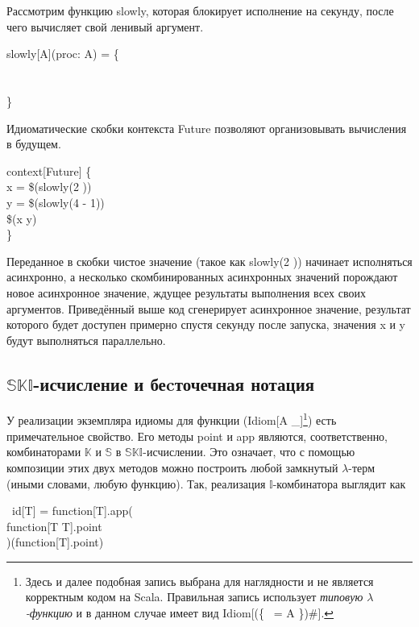 Рассмотрим функцию \<slowly\>, которая блокирует исполнение на секунду, после чего вычисляет свой ленивый аргумент.

\begin{haskell}
 slowly[A](proc: \Rightarrow A) = \{ \\
\\
\\
\}
\end{haskell}

Идиоматические скобки контекста \<Future\> позволяют организовывать вычисления в будущем.

\begin{haskell}
context[Future] \{ \\
\quad{} x = \$(slowly(2 )) \\
\quad{} y = \$(slowly(4 - 1)) \\
\quad\$(x \times y) \\
\}
\end{haskell}

Переданное в скобки чистое значение (такое как \<slowly(2 )\>) начинает исполняться асинхронно, а несколько скомбинированных асинхронных значений порождают новое асинхронное значение, ждущее результаты выполнения всех своих аргументов. Приведённый выше код сгенерирует асинхронное значение, результат которого будет доступен примерно спустя секунду после запуска, значения \<x\> и \<y\> будут выполняться параллельно. 

\subsection{$\mathds{SKI}$-исчисление и беcточечная нотация}
У реализации экземпляра идиомы для функции (\<Idiom[A \Rightarrow \_]\>\footnote{Здесь и далее подобная запись выбрана для наглядности и не является корректным кодом на Scala. Правильная запись использует \emph{типовую $\lambda$-функцию} и в данном случае имеет вид \<Idiom[(\{ ~\lambda[\alpha] = A \Rightarrow \alpha\})\#\lambda]\>.}) есть примечательное свойство. Его методы \<point\> и \<app\> являются, соответственно, комбинаторами $\mathds{K}$ и $\mathds{S}$ в $\mathds{SKI}$-исчислении\cite{curry1972combinatory}. Это означает, что с помощью композиции этих двух методов можно построить любой замкнутый $\lambda$-терм (иными словами, любую функцию). Так, реализация $\mathds{I}$-комбинатора выглядит как
\begin{haskell}
 ~id[T] = function[T].app( \\
\quad\quad function[T \Rightarrow T].point \\
)(function[T].point)
\end{haskell}

